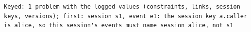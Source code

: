 \begin{lstlisting}[language={},basicstyle=\ttfamily\footnotesize,breaklines=true]
Keyed: 1 problem with the logged values (constraints, links, session keys, versions); first: session s1, event e1: the session key a.caller is alice, so this session's events must name session alice, not s1
\end{lstlisting}
